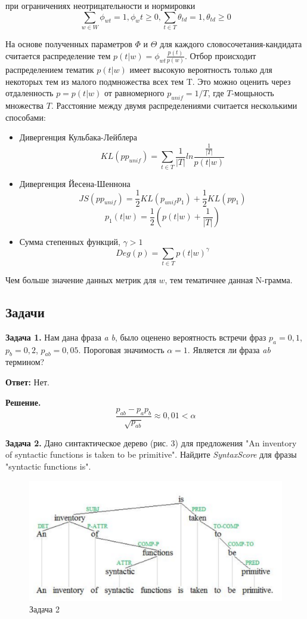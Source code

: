 при ограничениях неотрицательности и нормировки
$$\sum_{w \in W} \phi_{wt} = 1, \phi_wt \geq 0, \sum_{t \in T} \theta_{td} = 1, \theta_{td} \geq 0$$

На основе полученных параметров $\Phi$ и $\Theta$ для каждого словосочетания-кандидата считается распределение тем $p(t|w) = \phi_{wt} \frac{p(t)}{p(w)}$. Отбор происходит распределением тематик $p(t|w)$ имеет высокую вероятность только для некоторых тем из малого подмножества всех тем T. Это можно оценить через отдаленность $p = p(t|w)$ от равномерного $p_{unif} = 1/T$, где $T$-мощьность множества $T$. Расстояние между двумя распределениями считается несколькими способами:

\begin{itemize}
    \item Дивергенция Кульбака-Лейблера
          $$KL(pp_{unif}) = \sum_{t \in T} \frac{1}{|T|} ln \frac{\frac{1}{|T|}}{p(t|w)}$$
    \item Дивергенция Йесена-Шеннона
          $$JS(pp_{unif}) = \frac{1}{2}KL(p_{unif}p_{1}) + \frac{1}{2}KL(pp_{1})$$
          $$p_{1}(t|w) = \frac{1}{2}(p(t|w) + \frac{1}{|T|})$$
    \item Сумма степенных функций, $\gamma > 1$
          $$Deg(p) = \sum_{t \in T} p(t|w)^{\gamma}$$
\end{itemize}

Чем больше значение данных метрик для $w$, тем тематичнее данная N-грамма.

\subsection*{Задачи}

\textbf{Задача 1.} Нам дана фраза \textit{a} \textit{b}, было оценено вероятность встречи фраз $p_{a} = 0,1$, $p_{b} = 0,2$, $p_{ab} = 0,05$. Пороговая значимость $\alpha = 1$. Является ли фраза \textit{ab} термином?

\textbf{Ответ:} Нет.

\textbf{Решение.}
$$\frac{p_{ab}-p_{a}p_{b}}{\sqrt{p_{ab}}} \approx 0,01 < \alpha$$

\textbf{Задача 2.} Дано синтактическое дерево (рис. 3) для предложения "An inventory of syntactic functions is taken to be primitive". Найдите \textit{SyntaxScore} для фразы "syntactic functions is".

\begin{figure}
    \includegraphics[scale = 0.4]{chapters/rules/images/ml3.png}
    \caption{Задача 2}
\end{figure}

